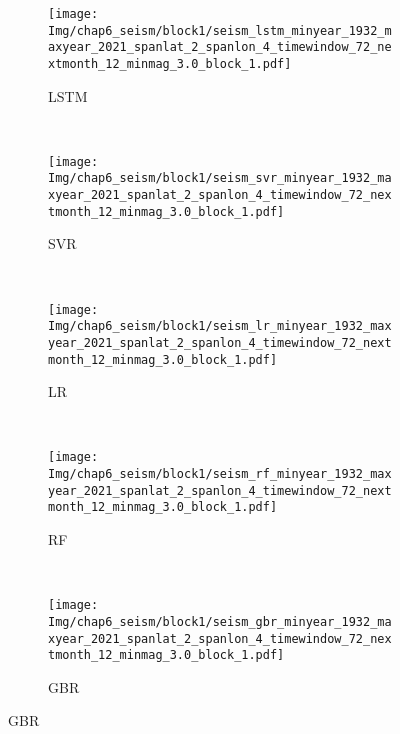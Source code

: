 \begin{figure}[!htbp]
  \centering
  \begin{subfigure}[b]{0.45\textwidth}
    \caption{LSTM}
    \vspace{-0.2cm}
    \texttt{[image: Img/chap6\_seism/block1/seism\_lstm\_minyear\_1932\_maxyear\_2021\_spanlat\_2\_spanlon\_4\_timewindow\_72\_nextmonth\_12\_minmag\_3.0\_block\_1.pdf]}
    \vspace{-1cm}
    \label{fig:seism_lstm_minyear_1932_maxyear_2021_spanlat_2_spanlon_4_timewindow_72_nextmonth_12_minmag_3.0_block_1}
  \end{subfigure}
  ~
  \begin{subfigure}[b]{0.45\textwidth}
    \caption{SVR} 
    \vspace{-0.2cm}
    \texttt{[image: Img/chap6\_seism/block1/seism\_svr\_minyear\_1932\_maxyear\_2021\_spanlat\_2\_spanlon\_4\_timewindow\_72\_nextmonth\_12\_minmag\_3.0\_block\_1.pdf]}
    \vspace{-1cm}
    \label{fig:seism_svr_minyear_1932_maxyear_2021_spanlat_2_spanlon_4_timewindow_72_nextmonth_12_minmag_3.0_block_1}
  \end{subfigure}   
  \\
  \begin{subfigure}[b]{0.45\textwidth}
      \caption{LR}
      \vspace{-0.2cm}
      \texttt{[image: Img/chap6\_seism/block1/seism\_lr\_minyear\_1932\_maxyear\_2021\_spanlat\_2\_spanlon\_4\_timewindow\_72\_nextmonth\_12\_minmag\_3.0\_block\_1.pdf]}
      \vspace{-1cm}
      \label{fig:seism_lr_minyear_1932_maxyear_2021_spanlat_2_spanlon_4_timewindow_72_nextmonth_12_minmag_3.0_block_1}
  \end{subfigure}
  ~
  \begin{subfigure}[b]{0.45\textwidth}
    \caption{RF}
    \vspace{-0.2cm}
    \texttt{[image: Img/chap6\_seism/block1/seism\_rf\_minyear\_1932\_maxyear\_2021\_spanlat\_2\_spanlon\_4\_timewindow\_72\_nextmonth\_12\_minmag\_3.0\_block\_1.pdf]}
    \vspace{-1cm}
    \label{fig:seism_rf_minyear_1932_maxyear_2021_spanlat_2_spanlon_4_timewindow_72_nextmonth_12_minmag_3.0_block_1}
  \end{subfigure}
  \\
  \begin{subfigure}[b]{0.45\textwidth}
    \caption{GBR}
    \vspace{-0.2cm}
    \texttt{[image: Img/chap6\_seism/block1/seism\_gbr\_minyear\_1932\_maxyear\_2021\_spanlat\_2\_spanlon\_4\_timewindow\_72\_nextmonth\_12\_minmag\_3.0\_block\_1.pdf]}

\end{subfigure}
\end{figure}
